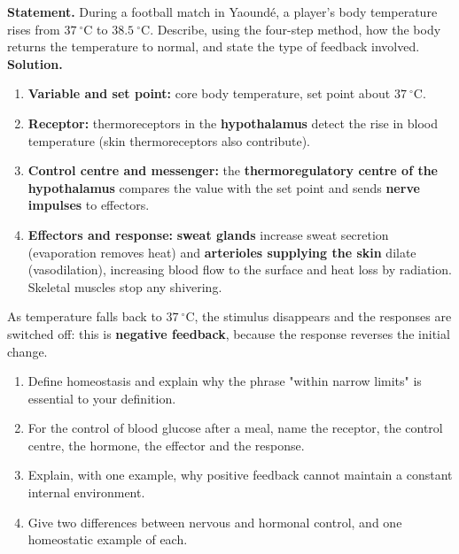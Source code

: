 \documentclass[11pt]{article}
\begin{document}
\begin{exoresolu}
\textbf{Statement.} During a football match in Yaound\'e, a player's body temperature rises from $37\ ^{\circ}\mathrm{C}$ to $38.5\ ^{\circ}\mathrm{C}$. Describe, using the four-step method, how the body returns the temperature to normal, and state the type of feedback involved.
\tcblower
\textbf{Solution.}
\begin{enumerate}
\item \textbf{Variable and set point:} core body temperature, set point about $37\ ^{\circ}\mathrm{C}$.
\item \textbf{Receptor:} thermoreceptors in the \textbf{hypothalamus} detect the rise in blood temperature (skin thermoreceptors also contribute).
\item \textbf{Control centre and messenger:} the \textbf{thermoregulatory centre of the hypothalamus} compares the value with the set point and sends \textbf{nerve impulses} to effectors.
\item \textbf{Effectors and response:} \textbf{sweat glands} increase sweat secretion (evaporation removes heat) and \textbf{arterioles supplying the skin} dilate (vasodilation), increasing blood flow to the surface and heat loss by radiation. Skeletal muscles stop any shivering.
\end{enumerate}
As temperature falls back to $37\ ^{\circ}\mathrm{C}$, the stimulus disappears and the responses are switched off: this is \textbf{negative feedback}, because the response reverses the initial change.
\end{exoresolu}

\begin{exercice}
\begin{enumerate}
\item Define homeostasis and explain why the phrase "within narrow limits" is essential to your definition.
\item For the control of blood glucose after a meal, name the receptor, the control centre, the hormone, the effector and the response.
\item Explain, with one example, why positive feedback cannot maintain a constant internal environment.
\item Give two differences between nervous and hormonal control, and one homeostatic example of each.
\end{enumerate}
\end{exercice}
\end{document}
